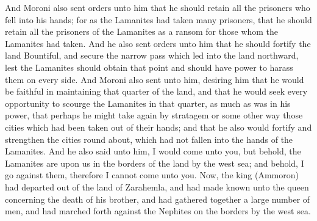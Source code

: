 And Moroni also sent orders unto him that he should retain all the prisoners who fell into his hands; for as the Lamanites had taken many prisoners, that he should retain all the prisoners of the Lamanites as a ransom for those whom the Lamanites had taken.
\bverse \iffalse And he also sent orders unto him that he should fortify the land Bountiful, and secure the narrow pass which led into the land northward, lest the Lamanites should obtain that point and should have power to harass them on every side. \fi
And he also sent orders unto him that he should fortify the land Bountiful, and secure the narrow pass which led into the land northward, lest the Lamanites should obtain that point and should have power to harass them on every side.
\bverse \iffalse And Moroni also sent unto him, desiring him that he would be faithful in maintaining that quarter of the land, and that he would seek every opportunity to scourge the Lamanites in that quarter, as much as was in his power, that perhaps he might take again by stratagem or some other way those cities which had been taken out of their hands; and that he also would fortify and strengthen the cities round about, which had not fallen into the hands of the Lamanites. \fi
And Moroni also sent unto him, desiring him that he would be faithful in maintaining that quarter of the land, and that he would seek every opportunity to scourge the Lamanites in that quarter, as much as was in his power, that perhaps he might take again by stratagem or some other way those cities which had been taken out of their hands; and that he also would fortify and strengthen the cities round about, which had not fallen into the hands of the Lamanites.
\bverse \iffalse And he also said unto him, I would come unto you, but behold, the Lamanites are upon us in the borders of the land by the west sea; and behold, I go against them, therefore I cannot come unto you. \fi
And he also said unto him, I would come unto you, but behold, the Lamanites are upon us in the borders of the land by the west sea; and behold, I go against them, therefore I cannot come unto you.
\bverse \iffalse Now, the king (Ammoron) had departed out of the land of Zarahemla, and had made known unto the queen concerning the death of his brother, and had gathered together a large number of men, and had marched forth against the Nephites on the borders by the west sea. \fi
Now, the king (Ammoron) had departed out of the land of Zarahemla, and had made known unto the queen concerning the death of his brother, and had gathered together a large number of men, and had marched forth against the Nephites on the borders by the west sea.
